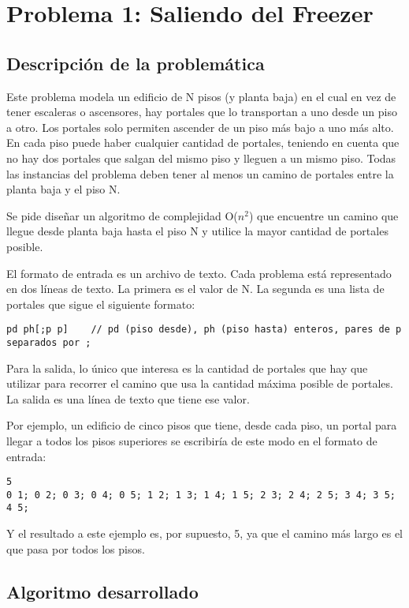 \section{Problema 1: Saliendo del Freezer}

\subsection{Descripción de la problemática}
Este problema modela un edificio de N pisos (y planta baja) en el cual en vez de tener escaleras o ascensores, hay portales que lo transportan a uno desde un piso a otro. Los portales solo permiten ascender de un piso más bajo a uno más alto. En cada piso puede haber cualquier cantidad de portales, teniendo en cuenta que no hay dos portales que salgan del mismo piso y lleguen a un mismo piso. Todas las instancias del problema deben tener al menos un camino de portales entre la planta baja y el piso N.

Se pide diseñar un algoritmo de complejidad O($n^{2}$) que encuentre un camino que llegue desde planta baja hasta el piso N y utilice la mayor cantidad de portales posible.

El formato de entrada es un archivo de texto. Cada problema está representado en dos líneas de texto. La primera es el valor de N. La segunda es una lista de portales que sigue el siguiente formato:

\begin{verbatim}
pd ph[;p p]    // pd (piso desde), ph (piso hasta) enteros, pares de p separados por ; 
\end{verbatim}

Para la salida, lo único que interesa es la cantidad de portales que hay que utilizar para recorrer el camino que usa la cantidad máxima posible de portales. La salida es una línea de texto que tiene ese valor.


Por ejemplo, un edificio de cinco pisos que tiene, desde cada piso, un portal para llegar a todos los pisos superiores se escribiría de este modo en el formato de entrada:

\begin{verbatim}
5
0 1; 0 2; 0 3; 0 4; 0 5; 1 2; 1 3; 1 4; 1 5; 2 3; 2 4; 2 5; 3 4; 3 5; 4 5;
\end{verbatim}

Y el resultado a este ejemplo es, por supuesto, 5, ya que el camino más largo es el que pasa por todos los pisos.


\subsection{Algoritmo desarrollado}


